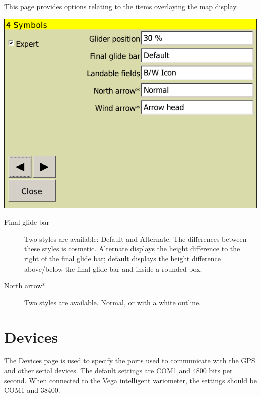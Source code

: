 This page provides options relating to the items overlaying the map display.

\begin{center}
\includegraphics[angle=0,width=0.8\linewidth,keepaspectratio='true']{figures/config-symbols.png}
\end{center}

\begin{description}


\item[Final glide bar]  Two styles are available: Default and
Alternate. The differences between these styles is cosmetic.  Alternate displays the height difference to the 
right of the final glide bar; default displays the height difference above/below the final glide bar and inside a 
rounded box.

\item[North arrow*]  Two styles are available.  Normal, or with a white outline.
\end{description}



\clearpage
\section{Devices} \label{conf:comdevices}

The Devices page is used to specify the ports used to communicate with
the GPS and other serial devices. The default settings are COM1 and
4800 bits per second.  When connected to the Vega intelligent
variometer, the settings should be COM1 and 38400.

